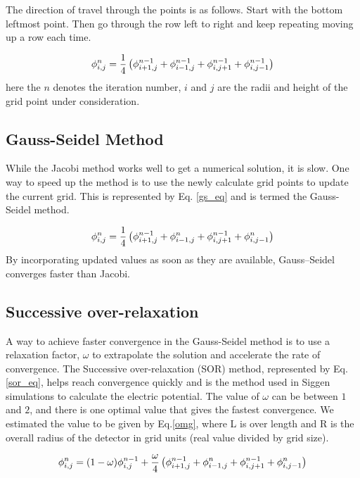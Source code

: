 The direction of travel through the points is as follows. Start with the bottom leftmost point. Then go through the row left to right and keep repeating moving up a row each time.


\begin{equation}{\label{jacobi}}
 \phi_{i,j}^{n} = \frac{1}{4}  \left(\phi^{n-1}_{i+1,j} + \phi^{n-1}_{i-1,j} + \phi^{n-1}_{i,j+1} + \phi^{n-1}_{i,j-1} \right)
\end{equation}
here the $n$ denotes the iteration number, $i$ and $j$ are the radii and height of the grid point under consideration. 

\subsection{Gauss-Seidel Method}

While the Jacobi method works well to get a numerical solution, it is slow. One way to speed up the method is to use the newly calculate grid points to update the current grid. This is represented by Eq. \ref{gs_eq} and is termed the Gauss-Seidel method.


\begin{equation}{\label{gs_eq}}
 \phi_{i,j}^{n} = \frac{1}{4}  \left(\phi^{n-1}_{i+1,j} + \phi^n_{i-1,j} + \phi^{n-1}_{i,j+1} + \phi^n_{i,j-1} \right)
\end{equation}
By incorporating updated values as soon as they are available, Gauss--Seidel converges faster than Jacobi.

\subsection{Successive over-relaxation}

A way to achieve faster convergence in the Gauss-Seidel method is to use a relaxation factor, $\omega$ to extrapolate the solution and accelerate the rate of convergence. The Successive over-relaxation (SOR) method, represented by Eq. \ref{sor_eq}, helps reach convergence quickly and is the method used in Siggen simulations to calculate the electric potential. The value of $\omega$ can be between $1$ and $2$, and there is one optimal value that gives the fastest convergence. We estimated the value to be given by Eq.\ref{omg}, where L is over length and R is the overall radius of the detector in grid units (real value divided by grid size).

\begin{equation}{\label{sor_eq}}
 \phi_{i,j}^{n} = (1-\omega)\phi^{n-1}_{i,j} + \frac{\omega}{4} \left(\phi^{n-1}_{i+1,j} + \phi^n_{i-1,j} + \phi^{n-1}_{i,j+1} + \phi^n_{i,j-1} \right)
\end{equation}

